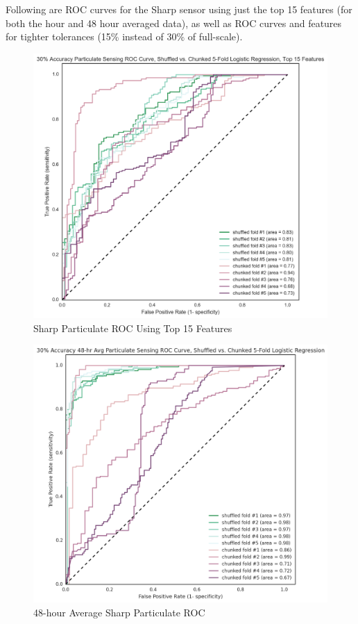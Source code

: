 Following are ROC curves for the Sharp sensor using just the top 15 features (for both the hour and 48 hour averaged data), as well as ROC curves and features for tighter tolerances (15\% instead of 30\% of full-scale).

\begin{figure}[htb]
 	\includegraphics[width=\textwidth]{figs/sharp_goals_30_roc_pruned_features}               
 	 \caption{Sharp Particulate ROC Using Top 15 Features}
  	\label{fig:sharp_30_roc_pruned_features}
\end{figure}


\begin{figure}[htb]
 	\includegraphics[width=\textwidth]{figs/sharp_48_avg_goals_30_roc}               
 	 \caption{48-hour Average Sharp Particulate ROC}
  	\label{fig:sharp_48_avg_goals_30_roc}
\end{figure}

